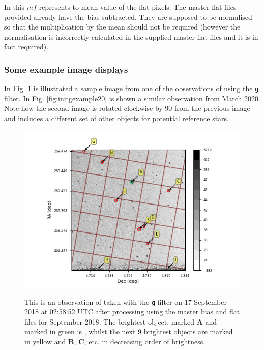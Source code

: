 In this $mf$ represents to mean value of the flat pixels. The master flat files
provided already have the bias subtracted. They are supposed to be normalised so
that the multiplication by the mean should not be required (however the
normalisation is incorrectly calculated in the supplied master flat files and it
is in fact required).

\subsubsection{Some example image displays}
\protect\label{section:eximages}

In Fig. \ref{fig:initgexample} is illustrated a sample image from one of the
observations of {\bstar} using the \texttt{g} filter. In Fig.
\ref{fig:initgexample20} is shown a similar observation from March 2020. Note
how the second image is rotated clockwise by 90\degree{} from the previous image
and includes a different set of other objects for potential reference stars.

\begin{figure}[!htbp]
\begin{center}
\includegraphics[scale=1]{images/initgexample.png}
\end{center}   
\caption{This is an observation of {\bstar} taken with the \texttt{g} filter on
17 September 2018 at 02:58:52 UTC after processing using the master bias and
flat files for September 2018. The brightest object, marked \textbf{A} and marked in
green is \bstar, whilst the next 9 brightest objects are marked in yellow and
\textbf{B}, \textbf{C}, etc. in decreasing order of brightness.}
\protect\label{fig:initgexample}
\end{figure}

